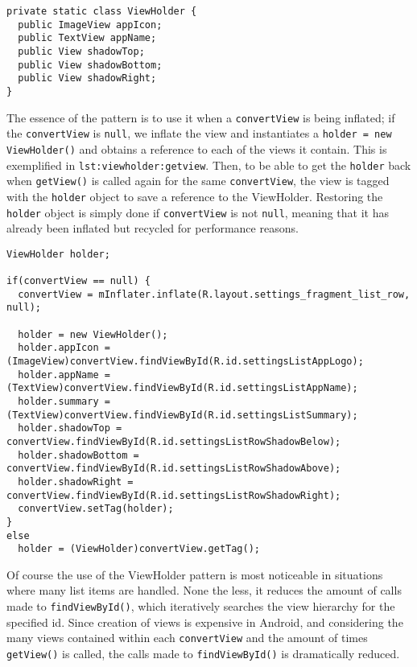 \begin{lstlisting}[caption={The intent filter and action a \giraf application has to provide to be shown in settings.}, label={lst:viewholder}]
private static class ViewHolder {
  public ImageView appIcon;
  public TextView appName;
  public View shadowTop;
  public View shadowBottom;
  public View shadowRight;
}
\end{lstlisting}

The essence of the pattern is to use it when a \lstinline|convertView| is being inflated; 
if the \lstinline|convertView| is \lstinline|null|, we inflate the view and instantiates a \lstinline|holder = new ViewHolder()| and obtains a reference to each of the views it contain.
This is exemplified in \lstinline|lst:viewholder:getview|.
Then, to be able to get the \lstinline|holder| back when \lstinline|getView()| is called again for the same \lstinline|convertView|, the view is tagged with the \lstinline|holder| object to save a reference to the ViewHolder.
Restoring the \lstinline|holder| object is simply done if \lstinline|convertView| is not \lstinline|null|, meaning that it has already been inflated but recycled for performance reasons.

\begin{lstlisting}[caption={Excerpt of the refactored \lstinline|getView()| method in \lstinline|SettingsListAdapter|.}, label={lst:viewholder:getview}]
ViewHolder holder;

if(convertView == null) {
  convertView = mInflater.inflate(R.layout.settings_fragment_list_row, null);

  holder = new ViewHolder();
  holder.appIcon = (ImageView)convertView.findViewById(R.id.settingsListAppLogo);
  holder.appName = (TextView)convertView.findViewById(R.id.settingsListAppName);
  holder.summary = (TextView)convertView.findViewById(R.id.settingsListSummary);
  holder.shadowTop = convertView.findViewById(R.id.settingsListRowShadowBelow);
  holder.shadowBottom = convertView.findViewById(R.id.settingsListRowShadowAbove);
  holder.shadowRight = convertView.findViewById(R.id.settingsListRowShadowRight);
  convertView.setTag(holder);
}
else
  holder = (ViewHolder)convertView.getTag();
\end{lstlisting}

Of course the use of the ViewHolder pattern is most noticeable in situations where many list items are handled.
None the less, it reduces the amount of calls made to \lstinline|findViewById()|, which iteratively searches the view hierarchy for the specified id.
Since creation of views is expensive in Android, and considering the many views contained within each \lstinline|convertView| and the amount of times \lstinline|getView()| is called, the calls made to  \lstinline|findViewById()| is dramatically reduced.\cite{understandingAdapters}

